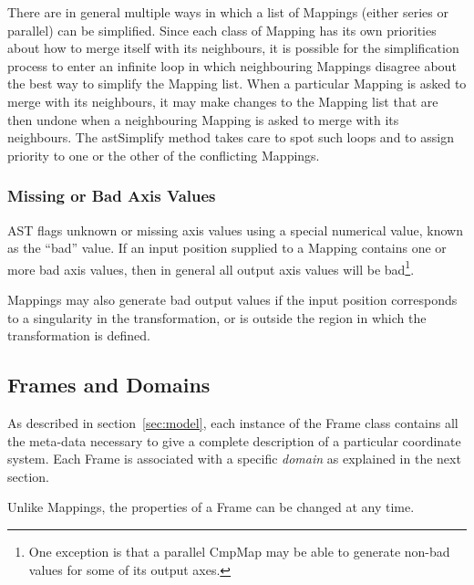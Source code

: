 \documentclass[final,authoryear,5p,times,twocolumn]{elsarticle}
\begin{document}
There are in general multiple ways in which a list of Mappings (either
series or parallel) can be simplified. Since each class of Mapping has
its own priorities about how to merge itself with its neighbours, it is
possible for the simplification process to enter an infinite loop in
which neighbouring Mappings disagree about the best way to simplify the
Mapping list. When a particular Mapping is asked to merge with its
neighbours, it may make changes to the Mapping list that are then undone
when a neighbouring Mapping is asked to merge with its neighbours. The
astSimplify method takes care to spot such loops and to assign priority
to one or the other of the conflicting Mappings.

\subsubsection{Missing or Bad Axis Values}
\label{sec:bad}
AST flags unknown or missing axis values using a special numerical value,
known as the ``bad'' value. If an input position supplied to a Mapping
contains one or more bad axis values, then in general all output axis
values will be bad\footnote{One exception is that a parallel CmpMap may
be able to generate non-bad values for some of its output axes.}.

Mappings may also generate bad output values if the input position
corresponds to a singularity in the transformation, or is outside the
region in which the transformation is defined.

\subsection{Frames and Domains}
As described in section~\ref{sec:model}, each instance of the Frame class
contains all the meta-data necessary to give a complete description of
a particular coordinate system. Each Frame is associated with a specific
\emph{domain} as explained in the next section.

Unlike Mappings, the properties of a Frame can be changed at any time.
\end{document}
